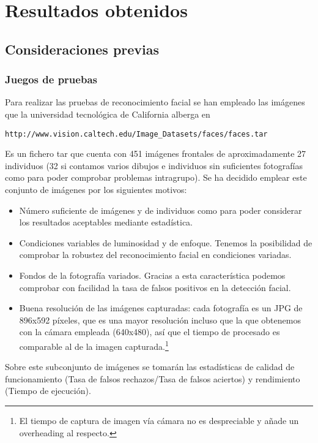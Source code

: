 \chapter{Resultados obtenidos}

\section{Consideraciones previas}

\subsection{Juegos de pruebas}
Para realizar las pruebas de reconocimiento facial se han empleado las imágenes que la universidad tecnológica de California alberga en 
\begin{verbatim}
http://www.vision.caltech.edu/Image_Datasets/faces/faces.tar 
\end{verbatim}
Es un fichero tar que cuenta con 451 imágenes frontales de aproximadamente 27 individuos (32 si contamos varios dibujos e individuos sin suficientes fotografías como para poder comprobar problemas intragrupo). Se ha decidido emplear este conjunto de imágenes por los siguientes motivos:
\begin{itemize}
	\item{Número suficiente de imágenes y de individuos como para poder considerar los resultados aceptables mediante estadística.}
	\item{Condiciones variables de luminosidad y de enfoque. Tenemos la posibilidad de comprobar la robustez del reconocimiento facial en condiciones variadas.}
	\item{Fondos de la fotografía variados. Gracias a esta característica podemos comprobar con facilidad la tasa de falsos positivos en la detección facial.}
	\item{Buena resolución de las imágenes capturadas: cada fotografía es un JPG de 896x592 píxeles, que es una mayor resolución incluso que la que obtenemos con la cámara empleada (640x480), así que el tiempo de procesado es comparable al de la imagen capturada.\footnote{El tiempo de captura de imagen vía cámara no es despreciable y añade un overheading al respecto.} }
\end{itemize}

Sobre este subconjunto de imágenes se tomarán las estadísticas de calidad de funcionamiento (Tasa de falsos rechazos/Tasa de falsos aciertos) y rendimiento (Tiempo de ejecución).

